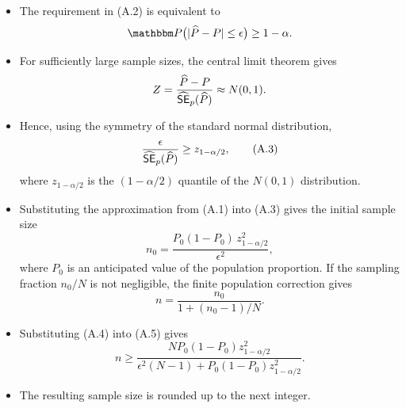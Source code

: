 \documentclass{my_eth_beamer}
\numberwithin{equation}{section}
\begin{document}
\begin{frame}
    \begin{itemize}
    \setlength{\itemsep}{10pt}
        \item The requirement in (A.2) is \alert{equivalent} to
            \begin{equation*}
                \PP\bigl(\lvert\props-\propu\rvert\leq\epsilon\bigr)
                \geq 1-\alpha.
            \end{equation*}
        \item For sufficiently large sample sizes, the \alert{central limit
            theorem} gives
            \begin{equation*}
                Z = \frac{\widehat{P}-P}
                {\widehat{\mathsf{SE}}_p(\widehat{P})}
                \approx N(0,1).
            \end{equation*}
        \item Hence, using the \alert{symmetry} of the standard normal
            distribution,
            \begin{equation*}
                \frac{\epsilon}{\widehat{\mathsf{SE}}_p(\widehat{P})}
                \geq z_{1-\alpha/2},
                \tag{A.3}
            \end{equation*}
            where $z_{1-\alpha/2}$ is the $(1-\alpha/2)$ quantile of the $N(0,1)$
            distribution.
    \end{itemize}
\end{frame}

\begin{frame}
    \begin{itemize}
    \setlength{\itemsep}{0pt}
        \item Substituting the approximation from (A.1) into (A.3) gives the
            initial sample size
            \begin{equation*}
                n_0 =
                \frac{P_0(1-P_0)\,z_{1-\alpha/2}^2}{\epsilon^2}, \tag{A.4}
            \end{equation*}
            where $P_0$ is an \alert{anticipated value} of the population
            proportion. If the sampling fraction $n_0/N$ is not negligible, the
            \alert{finite population correction} gives
            \begin{equation*}
                n =
                \frac{n_0}{1+(n_0-1)/N}. \tag{A.5}
            \end{equation*}
        \item Substituting (A.4) into (A.5) gives
            \begin{equation*}
                n \geq \frac{N P_0(1-P_0)z_{1-\alpha/2}^2}{
                    \epsilon^2(N-1) + P_0(1-P_0)z_{1-\alpha/2}^2}.
            \end{equation*}
        \item The resulting sample size is rounded up to the next integer.
    \end{itemize}
\end{frame}
\end{document}

